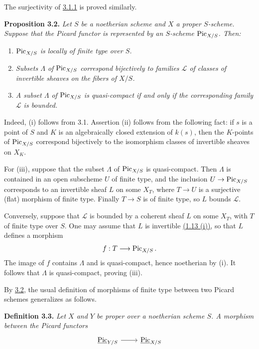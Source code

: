 The surjectivity of \hyperlink{sga6.e13.eq.3-1-1}{3.1.1} is proved similarly.

\textbf{Proposition 3.2.} \emph{Let \(S\) be a noetherian scheme and
\(X\) a proper \(S\)-scheme. Suppose that the Picard functor is
represented by an \(S\)-scheme \(\operatorname{Pic}_{X/S}\). Then:}
\begin{enumerate}[label=(\roman*)]
\item \emph{\(\operatorname{Pic}_{X/S}\) is locally of finite type over \(S\).}
\item \emph{Subsets \(\Lambda\) of \(\operatorname{Pic}_{X/S}\) correspond bijectively
to families \(\mathscr L\) of classes of invertible sheaves on the fibers
of \(X/S\).}
\item \emph{A subset \(\Lambda\) of \(\operatorname{Pic}_{X/S}\) is quasi-compact if
and only if the corresponding family \(\mathscr L\) is bounded.}
\end{enumerate}

Indeed, (i) follows from 3.1. Assertion (ii) follows from the following
fact: if \(s\) is a point of \(S\) and \(K\) is an algebraically closed
extension of \(k(s)\), then the \(K\)-points of \(\operatorname{Pic}_{X/S}\) correspond
bijectively to the isomorphism classes of invertible sheaves on \(X_K\).

For (iii), suppose that the subset \(\Lambda\) of \(\operatorname{Pic}_{X/S}\) is
quasi-compact. Then \(\Lambda\) is contained in an open subscheme \(U\)
of finite type, and the inclusion \(U\to\operatorname{Pic}_{X/S}\) corresponds to an
invertible sheaf \(L\) on some \(X_T\), where \(T\to U\) is a surjective
(flat) morphism of finite type. Finally \(T\to S\) is of finite type, so
\(L\) bounds \(\mathscr L\).

Conversely, suppose that \(\mathscr L\) is bounded by a coherent sheaf
\(L\) on some \(X_T\), with \(T\) of finite type over \(S\). One may
assume that \(L\) is invertible \hyperlink{sga6.e13.thm.1-13}{(1.13 (i))}, so that \(L\) defines a
morphism
\[
f:T\longrightarrow\operatorname{Pic}_{X/S}.
\]
The image of \(f\) contains \(\Lambda\) and is quasi-compact, hence
noetherian by (i). It follows that \(\Lambda\) is quasi-compact, proving
(iii).

By \hyperlink{sga6.e13.prop.3-2}{3.2}, the usual definition of morphisms of finite type between two
Picard schemes generalizes as follows.

\textbf{Definition 3.3.} \emph{Let \(X\) and \(Y\) be proper over a
noetherian scheme \(S\). A morphism between the Picard functors}
\[
\begin{tikzcd}
\underline{\Pic}_{Y/S}\arrow[r]&\underline{\Pic}_{X/S}
\end{tikzcd}
\]

